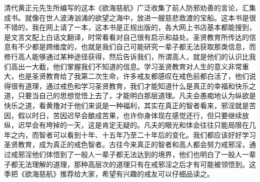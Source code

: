 \begin{book}[《欲海慈航》]
    清代黄正元先生所编写的这本《欲海慈航》广泛收集了前人防邪劝善的言论，汇集成书。就像在世人波涛汹涌的欲望之海中，放进一艘慈悲救渡的宝船。这本书是很不错的，我在网上请了一本，这本书是正规出版的，各大网上书店基本都能搜到，是文言文配上白话文翻译，时常看看对自己很有启示和益处。圣贤教育所传达的信息有不少都是跨维度的，也就是我们自己可能研究一辈子都无法获取那类信息，而修行高人能够通过某种途径获得，然后告诉我们，所谓高人，就是他们的认识比我们高出一大截，他们掌握我们不知道的信息。学习圣贤教育对人生的意义非常重大，也是圣贤教育给了我第二次生命，许多戒友都感叹在戒色前都白活了，他们说得很有道理，通过戒色和学习圣贤教育，我们才能知道什么是真正的幸福和快乐之道，只要当自己的思想觉悟上去了，才能明白那层道理。凡夫会愚痴地认为纵欲是快乐之道，看黄撸对于他们来说是一种福利，其实在真正的智者看来，邪淫就是苦因，假以时日，苦因迟早会酿成苦果，也许你身体现在感觉还行，但只要继续放纵，迟早会有垮掉的一天，这是肯定无疑的。凡夫的眼光和体会往往只能局限在几年之内，而智者可以看到十年、十五年乃至二十年后的变化。我们都应该好好学习圣贤教育，成为真正的戒色智者。古往今来真正的智者和高人都会努力戒邪淫，通过戒邪淫他们体悟到了一般人一辈子都无法达到的境界，他们也明白了一般人一辈子都无法理解的道理，那种高层次的道理只有在戒邪淫之后才有可能被领悟到。这季把《欲海慈航》推荐给大家，希望有兴趣的戒友可以仔细品读之。
\end{book}

